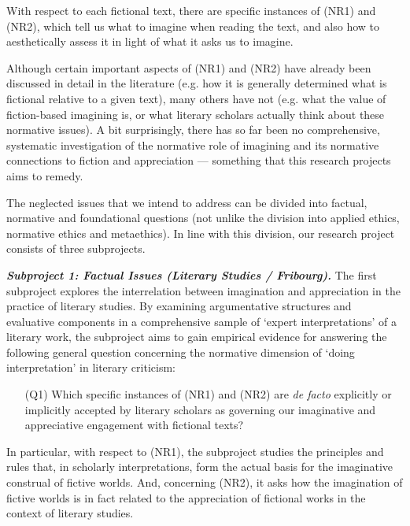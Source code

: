 \noindent With respect to each fictional text, there are specific instances of (NR1) and (NR2), which tell us what to imagine when reading the text, and also how to aesthetically assess it in light of what it asks us to imagine.

Although certain important aspects of (NR1) and (NR2) have already been discussed in detail in the literature (e.g. how it is generally determined what is fictional relative to a given text), many others have not (e.g. what the value of fiction-based imagining is, or what literary scholars actually think about these normative issues). A bit surprisingly, there has so far been no comprehensive, systematic investigation of the normative role of imagining and its normative connections to fiction and appreciation --- something that this research projects aims to remedy. 

The neglected issues that we intend to address can be divided into factual, normative and foundational questions (not unlike the division into applied ethics, normative ethics and metaethics). In line with this division, our research project consists of three subprojects.

\vspace{.2cm}
\noindent\textbf{\emph{Subproject 1: Factual Issues (Literary Studies / Fribourg).}} The first subproject explores the interrelation between imagination and appreciation in the practice of literary studies. By examining argumentative structures and evaluative components in a comprehensive sample of `expert interpretations' of a literary work, the subproject aims to gain empirical evidence for answering the following general question concerning the normative dimension of `doing interpretation' in literary criticism:

\vspace{-.1cm}
\begin{itemize}[leftmargin=2cm]
\item[(Q1)] Which specific instances of (NR1) and (NR2) are \emph{de facto} explicitly or implicitly accepted by literary scholars as governing our imaginative and appreciative engagement with fictional texts?
\end{itemize}
\vspace{-.1cm}

\noindent In particular, with respect to (NR1), the subproject studies the principles and rules that, in scholarly interpretations, form the actual basis for the imaginative construal of fictive worlds. And, concerning (NR2), it asks how the imagination of fictive worlds is in fact related to the appreciation of fictional works in the context of literary studies.

